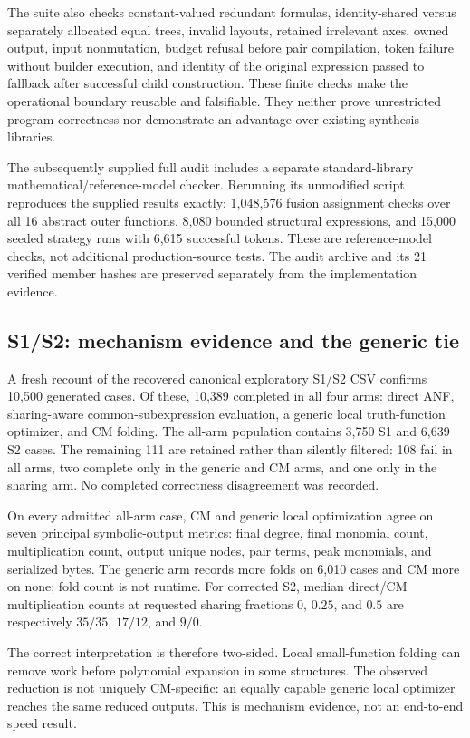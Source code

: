\documentclass[10pt]{article}
\theoremstyle{plain}
\theoremstyle{definition}
\theoremstyle{remark}
\begin{document}
The suite also checks constant-valued redundant formulas, identity-shared versus separately allocated equal trees, invalid layouts, retained irrelevant axes, owned output, input nonmutation, budget refusal before pair compilation, token failure without builder execution, and identity of the original expression passed to fallback after successful child construction. These finite checks make the operational boundary reusable and falsifiable. They neither prove unrestricted program correctness nor demonstrate an advantage over existing synthesis libraries.

The subsequently supplied full audit includes a separate standard-library mathematical/reference-model checker. Rerunning its unmodified script reproduces the supplied results exactly: 1,048,576 fusion assignment checks over all 16 abstract outer functions, 8,080 bounded structural expressions, and 15,000 seeded strategy runs with 6,615 successful tokens. These are reference-model checks, not additional production-source tests. The audit archive and its 21 verified member hashes are preserved separately from the implementation evidence.

\subsection{S1/S2: mechanism evidence and the generic tie}

A fresh recount of the recovered canonical exploratory S1/S2 CSV confirms 10,500 generated cases. Of these, 10,389 completed in all four arms: direct ANF, sharing-aware common-subexpression evaluation, a generic local truth-function optimizer, and CM folding. The all-arm population contains 3,750 S1 and 6,639 S2 cases. The remaining 111 are retained rather than silently filtered: 108 fail in all arms, two complete only in the generic and CM arms, and one only in the sharing arm. No completed correctness disagreement was recorded.

On every admitted all-arm case, CM and generic local optimization agree on seven principal symbolic-output metrics: final degree, final monomial count, multiplication count, output unique nodes, pair terms, peak monomials, and serialized bytes. The generic arm records more folds on 6,010 cases and CM more on none; fold count is not runtime. For corrected S2, median direct/CM multiplication counts at requested sharing fractions $0$, $0.25$, and $0.5$ are respectively $35/35$, $17/12$, and $9/0$.

The correct interpretation is therefore two-sided. Local small-function folding can remove work before polynomial expansion in some structures. The observed reduction is not uniquely CM-specific: an equally capable generic local optimizer reaches the same reduced outputs. This is mechanism evidence, not an end-to-end speed result.
\end{document}
